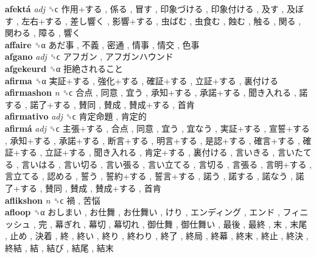 \textbf{afektá} \emph{adj}  ␝ϲ   作用+する ,  係る ,  冒す ,  印象づける ,  印象付ける ,  及す ,  及ぼす ,  左右+する ,  差し響く ,  影響+する ,  虫ばむ ,  虫食む ,  蝕む ,  触る ,  関る ,  関わる ,  障る ,  響く   \\
\textbf{affaire} ␝α   あだ事 ,  不義 ,  密通 ,  情事 ,  情交 ,  色事   \\
\textbf{afgano} \emph{adj}  ␝ϲ   アフガン ,  アフガンハウンド   \\
\textbf{afgekeurd} ␝α   拒絶されること   \\
\textbf{afirma} ␝α   実証+する ,  強化+する ,  確証+する ,  立証+する ,  裏付ける   \\
\textbf{afirmashon} \emph{n}  ␝ϲ   合点 ,  同意 ,  宜う ,  承知+する ,  承諾+する ,  聞き入れる ,  諾する ,  諾了+する ,  賛同 ,  賛成 ,  賛成+する ,  首肯   \\
\textbf{afirmativo} \emph{adj}  ␝ϲ   肯定命題 ,  肯定的   \\
\textbf{afirmá} \emph{adj}  ␝ϲ   主張+する ,  合点 ,  同意 ,  宜う ,  宜なう ,  実証+する ,  宣誓+する ,  承知+する ,  承諾+する ,  断言+する ,  明言+する ,  是認+する ,  確言+する ,  確証+する ,  立証+する ,  聞き入れる ,  肯定+する ,  裏付ける ,  言いきる ,  言いたてる ,  言いはる ,  言い切る ,  言い張る ,  言い立てる ,  言切る ,  言張る ,  言明+する ,  言立てる ,  認める ,  誓う ,  誓約+する ,  誓言+する ,  諾う ,  諾する ,  諾なう ,  諾了+する ,  賛同 ,  賛成 ,  賛成+する ,  首肯   \\
\textbf{aflikshon} \emph{n}  ␝ϲ   禍 ,  苦悩   \\
\textbf{afloop} ␝α   おしまい ,  お仕舞 ,  お仕舞い ,  けり ,  エンディング ,  エンド ,  フィニッシュ ,  完 ,  幕ぎれ ,  幕切 ,  幕切れ ,  御仕舞 ,  御仕舞い ,  最後 ,  最終 ,  末 ,  末尾 ,  止め ,  決着 ,  終 ,  終い ,  終り ,  終わり ,  終了 ,  終局 ,  終幕 ,  終末 ,  終止 ,  終決 ,  終結 ,  結 ,  結び ,  結尾 ,  結末   \\

